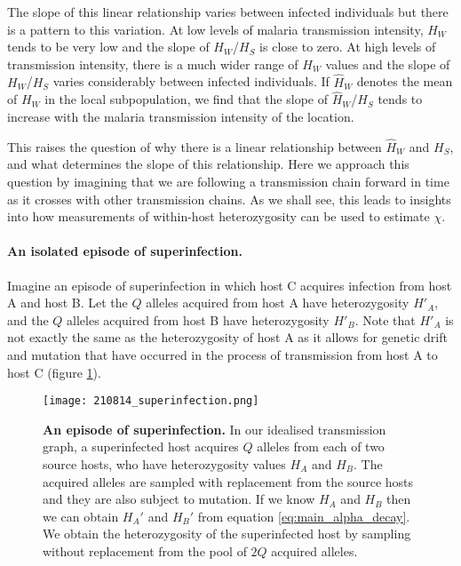 \documentclass[_main.tex]{subfiles}
\begin{document}
The slope of this linear relationship varies between infected individuals but there is a pattern to this variation.  At low levels of malaria transmission intensity, $H_W$ tends to be very low and the slope of $H_W$/$H_S$ is close to zero.  At high levels of transmission intensity, there is a much wider range of $H_W$ values and the slope of $H_W$/$H_S$ varies considerably between infected individuals.  If  $\widehat{H}_W$ denotes the mean of $H_W$ in the local subpopulation, we find that the slope of $\widehat{H}_W$/$H_S$ tends to increase with the malaria transmission intensity of the location.

This raises the question of why there is a linear relationship between $\widehat{H}_W$ and $H_S$, and what determines the slope of this relationship.  Here we approach this question by imagining that we are following a transmission chain forward in time as it crosses with other transmission chains.  As we shall see, this leads to insights into how measurements of within-host heterozygosity can be used to estimate $\chi$.

\paragraph{An isolated episode of superinfection.}  Imagine an episode of superinfection in which host C acquires infection from host A and host B.  Let the $Q$ alleles acquired from host A have heterozygosity $H'_A$, and the $Q$ alleles acquired from host B have heterozygosity $H'_B$.  Note that $H'_A$ is not exactly the same as the heterozygosity of host A as it allows for genetic drift and mutation that have occurred in the process of transmission from host A to host C (figure \ref{fig:main_superinfected}).  

\begin{figure}[h!]
\centering
\texttt{[image: 210814\_superinfection.png]}
\caption{\textbf{An episode of superinfection.}  In our idealised transmission graph, a superinfected host acquires $Q$ alleles from each of two source hosts, who have heterozygosity values $H_A$ and $H_B$.  The acquired alleles are sampled with replacement from the source hosts and they are also subject to mutation.  If we know $H_A$ and $H_B$ then we can obtain $H_A'$ and $H_B'$ from equation \ref{eq:main_alpha_decay}.  We obtain the heterozygosity of the superinfected host by sampling without replacement from the pool of $2Q$ acquired alleles.}
\label{fig:main_superinfected}
\end{figure}
\end{document}
